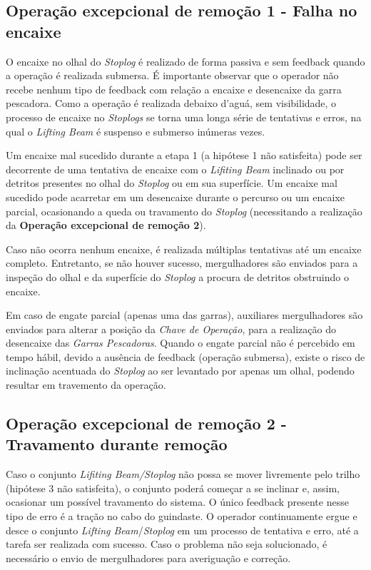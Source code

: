 \subsection{Operação excepcional de remoção 1 - Falha no encaixe}
\label{op:rem:1}
O encaixe no olhal do \emph{Stoplog} é realizado de forma passiva e sem feedback
quando a operação é realizada submersa. É importante observar que o operador não
recebe nenhum tipo de feedback com relação a encaixe e desencaixe da garra
pescadora. Como a operação é realizada debaixo d'aguá, sem visibilidade, o
processo de encaixe no \emph{Stoplogs} se torna uma longa série de tentativas e
erros, na qual o \emph{Lifting Beam} é suspenso e submerso inúmeras vezes.

Um encaixe mal sucedido durante a etapa 1 (a hipótese 1 não satisfeita) pode ser
decorrente de uma tentativa de encaixe com o \emph{Lifiting Beam} inclinado ou
por detritos presentes no olhal do \emph{Stoplog} ou em sua superfície. Um
encaixe mal sucedido pode acarretar em um desencaixe durante o percurso ou um
encaixe parcial, ocasionando a queda ou travamento do \emph{Stoplog}
(necessitando a realização da \textbf{Operação excepcional de remoção 2}).

Caso não ocorra nenhum encaixe, é realizada múltiplas tentativas até um encaixe
completo. Entretanto, se não houver sucesso, mergulhadores são enviados para a
inspeção do olhal e da superfície do \emph{Stoplog} a procura de detritos
obstruindo o encaixe.

Em caso de engate parcial (apenas uma das garras), auxiliares mergulhadores
são enviados para alterar a posição da \emph{Chave de Operação}, para a
realização do desencaixe das \emph{Garras Pescadoras}. Quando o engate
parcial não é percebido em tempo hábil, devido a ausência de feedback (operação
submersa), existe o risco de inclinação acentuada do \emph{Stoplog} ao ser
levantado por apenas um olhal, podendo resultar em travemento da operação.



\subsection{Operação excepcional de remoção 2 - Travamento durante remoção}
\label{op:rem:2}

Caso o conjunto \emph{Lifiting Beam/Stoplog} não possa se mover livremente pelo trilho (hipótese 3 não satisfeita), o conjunto poderá começar a se inclinar e, assim, ocasionar um possível travamento do sistema. O único feedback presente nesse tipo de erro é a tração no cabo do guindaste. O operador continuamente ergue e desce o conjunto \emph{Lifting Beam}/\emph{Stoplog} em um 
processo de tentativa e erro, até a tarefa ser realizada com sucesso.
Caso o problema não seja solucionado, é necessário o envio de mergulhadores para averiguação e correção. 

